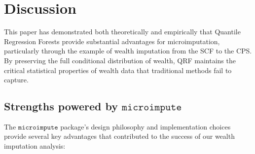 \section{Discussion}

This paper has demonstrated both theoretically and empirically that Quantile Regression Forests provide substantial advantages for microimputation, particularly through the example of wealth imputation from the SCF to the CPS. By preserving the full conditional distribution of wealth, QRF maintains the critical statistical properties of wealth data that traditional methods fail to capture.

\subsection{Strengths powered by $\texttt{microimpute}$}

The $\texttt{microimpute}$ package's design philosophy and implementation choices provide several key advantages that contributed to the success of our wealth imputation analysis:


